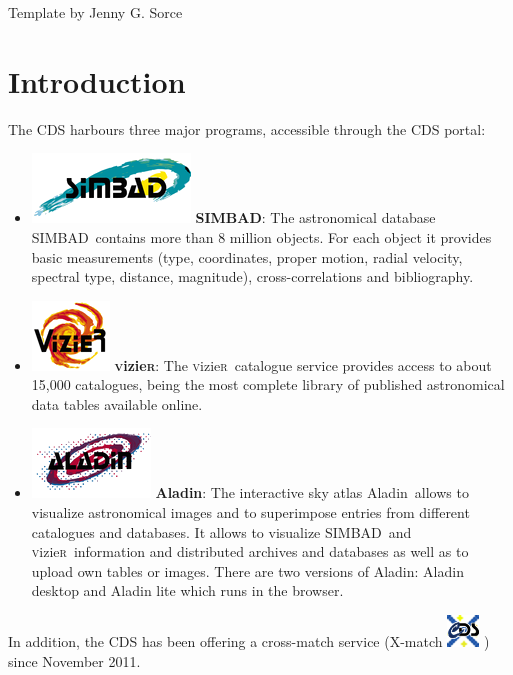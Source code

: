 \documentclass [a4paper, 12pt]{article}
\newcommand{\aladin}{{\textsc{A}{ladin}}}
\newcommand{\simbad}{{\textsc{SIMBAD}}}
\newcommand{\vizier}{{\textsc{v}izie\textsc{r}}}
\begin{document}
\vspace{3.5cm}
Template by Jenny G. Sorce


\newpage
\normalsize
\vfill
\tableofcontents
\vfill

\newpage

\justify
\section{Introduction}

The CDS harbours three major programs, accessible through the CDS portal:\\
\begin{itemize}
\item \includegraphics[width=0.1 \textwidth]{../images/logo_simbad.png} 
\textbf{\simbad}: The astronomical database \simbad\ contains more than 
8 million objects. For each object it provides basic measurements (type, 
coordinates, proper motion, radial velocity, spectral type, distance, 
magnitude), cross-correlations and bibliography.
\item \includegraphics[width=0.08  \textwidth]{../images/logo_vizier.png}  
\textbf{\vizier}: The \vizier\ catalogue service provides access to about 
15,000 catalogues, being the most complete library of published astronomical 
data tables available online.
\item \includegraphics[width=0.1  \textwidth]{../images/logo_aladin.png} 
\textbf{\aladin}: The interactive sky atlas \aladin\ allows to 
visualize astronomical images and to superimpose entries from different 
catalogues and databases. It allows to visualize \simbad\ and \vizier\ 
information and distributed archives and databases as well as to upload own 
tables or images. There are two versions of \aladin: Aladin desktop and Aladin 
lite which runs in the browser.
\end{itemize}

In addition, the CDS has been offering a cross-match service 
(X-match \includegraphics[width=0.03 
\textwidth]{../images/logo_cds_xmatch.png} ) since November 2011. 
\end{document}
